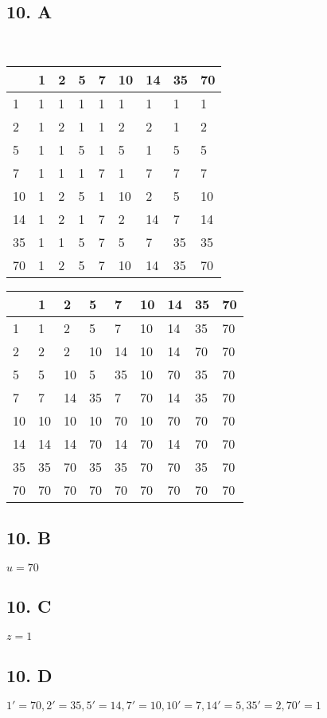 \documentclass[12]{scrartcl}
\begin{document}
\subsection*{10. A}
\ \\
\begin{table}
    \begin{tabular}{|l|l|l|l|l|l|l|l|l|}
    \hline
    ~  & 1 & 2 & 5 & 7 & 10 & 14 & 35 & 70 \\ \hline
    1  & 1 & 1 & 1 & 1 & 1  & 1  & 1  & 1  \\ \hline
    2  & 1 & 2 & 1 & 1 & 2  & 2  & 1  & 2  \\ \hline
    5  & 1 & 1 & 5 & 1 & 5  & 1  & 5  & 5  \\ \hline
    7  & 1 & 1 & 1 & 7 & 1  & 7  & 7  & 7  \\ \hline
    10 & 1 & 2 & 5 & 1 & 10 & 2  & 5  & 10 \\ \hline
    14 & 1 & 2 & 1 & 7 & 2  & 14 & 7  & 14 \\ \hline
    35 & 1 & 1 & 5 & 7 & 5  & 7  & 35 & 35 \\ \hline
    70 & 1 & 2 & 5 & 7 & 10 & 14 & 35 & 70 \\ \hline
    \end{tabular}
\end{table}
\begin{table}
    \begin{tabular}{|l|l|l|l|l|l|l|l|l|}
    \hline
    ~  & 1  & 2  & 5  & 7  & 10 & 14 & 35 & 70 \\ \hline
    1  & 1  & 2  & 5  & 7  & 10 & 14 & 35 & 70 \\ \hline
    2  & 2  & 2  & 10 & 14 & 10 & 14 & 70 & 70 \\ \hline
    5  & 5  & 10 & 5  & 35 & 10 & 70 & 35 & 70 \\ \hline
    7  & 7  & 14 & 35 & 7  & 70 & 14 & 35 & 70 \\ \hline
    10 & 10 & 10 & 10 & 70 & 10 & 70 & 70 & 70 \\ \hline
    14 & 14 & 14 & 70 & 14 & 70 & 14 & 70 & 70 \\ \hline
    35 & 35 & 70 & 35 & 35 & 70 & 70 & 35 & 70 \\ \hline
    70 & 70 & 70 & 70 & 70 & 70 & 70 & 70 & 70 \\ \hline
    \end{tabular}
\end{table}
\subsection*{10. B}
$u = 70$
\subsection*{10. C}
$z = 1$
\subsection*{10. D}
$1' = 70, 2' = 35, 5' = 14, 7' = 10, 10' = 7, 14' = 5, 35' = 2, 70' = 1$
\end{document}
